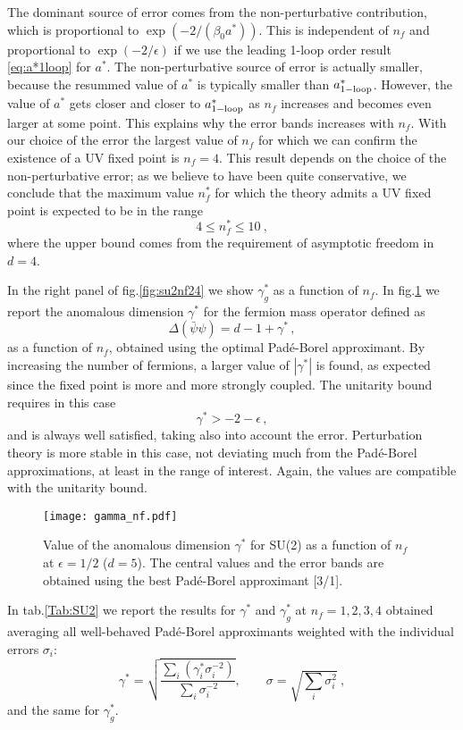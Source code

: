 \documentclass [11pt]{article}
\def\be{\begin{equation}} \def\ee{\end{equation}}
\begin{document}
The dominant source of error comes from the non-perturbative contribution, which is proportional to $\exp(-2/(\beta_0 a^*))$. This is 
independent of $n_f$ and proportional to $\exp(-2/\epsilon)$  if we use the leading 1-loop order result \eqref{eq:a*1loop} for $a^*$.
The non-perturbative source of error is actually smaller, because the resummed value of $a^*$ is typically smaller than $a^*_{{\rm 1-loop}}$.
However, the value of $a^*$ gets closer and closer to $a^*_{{\rm 1-loop}}$ as $n_f$ increases and becomes even larger at some point. This explains why the error bands
increases with $n_f$. With our choice of the error the largest value of $n_f$ for which we can confirm the existence of a UV fixed point is $n_f=4$. This result depends on the choice of the non-perturbative error; as we believe to have been quite conservative, we conclude that the maximum value $n_f^*$ for which the theory admits a UV fixed point is expected to be in the range
\begin{equation}
4\leq n_f^* \leq 10~,
\end{equation}
where the upper bound comes from the requirement of asymptotic freedom in $d=4$. 


In the right panel of fig.\ref{fig:su2nf24} we show $\gamma_g^*$ as a function of $n_f$.
In fig.\ref{fig:gamma_su2_nf24} we report the anomalous dimension $\gamma^*$  for the fermion mass operator defined as 
\be
\Delta(\bar{\psi}\psi)=d-1+\gamma^*\,,
\ee
as a function of $n_f$, obtained using the optimal Pad\'e-Borel approximant. By increasing the number of fermions, a larger value of $|\gamma^*|$ is found, as expected since the fixed point is more and more strongly coupled.
The unitarity bound requires in this case
\be
\gamma^*> -2-\epsilon \,,
\ee
and is always well satisfied, taking also into account the error. Perturbation theory is more stable in this case, not deviating much  from the Pad\'e-Borel approximations, at least in the range of interest.  
Again, the values are compatible with the unitarity bound. 

 \begin{figure} [t!]
 \centering
 \texttt{[image: gamma\_nf.pdf]}  
\caption{Value of the anomalous dimension $\gamma^*$ for SU(2) as a function of $n_f$ at $\epsilon=1/2$ ($d=5$). The central values and the error bands are obtained using the best Pad\'e-Borel approximant [3/1]. } 
\label{fig:gamma_su2_nf24}
\end{figure}

 
In tab.\ref{Tab:SU2} we report the results for $\gamma^*$ and $\gamma_g^*$ at $n_f=1,2,3,4$  obtained averaging  all well-behaved Pad\'e-Borel approximants weighted with the individual errors $\sigma_i$:  \begin{equation}
\gamma^*= \sqrt{\frac{\sum_i(\gamma_{i}^*\sigma_i^{-2})}{\sum_{i}\sigma_i^{-2}}}, \quad \quad
 \sigma=\sqrt{{\sum_{i}\sigma_i^{2}}}\ ,
 \label{eqn:gammagAverage}	
 \end{equation}
 and the same for $\gamma^*_g$.
\end{document}
